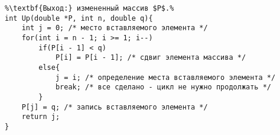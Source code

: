 \begin{lstlisting}[escapechar=\%]
%\noindent\textbf{Вход:} $n$ - длина обрабатываемой части массива $P$, $q$ - вставляемая сумма.\\%
%\textbf{Выход:} измененный массив $P$.%
int Up(double *P, int n, double q){
	int j = 0; /* место вставляемого элемента */
	for(int i = n - 1; i >= 1; i--)
		if(P[i - 1] < q)
			P[i] = P[i - 1]; /* сдвиг элемента массива */
		else{
			j = i; /* определение места вставляемого элемента */
			break; /* все сделано - цикл не нужно продолжать */
		}
	P[j] = q; /* запись вставляемого элемента */
	return j;
}
\end{lstlisting}
